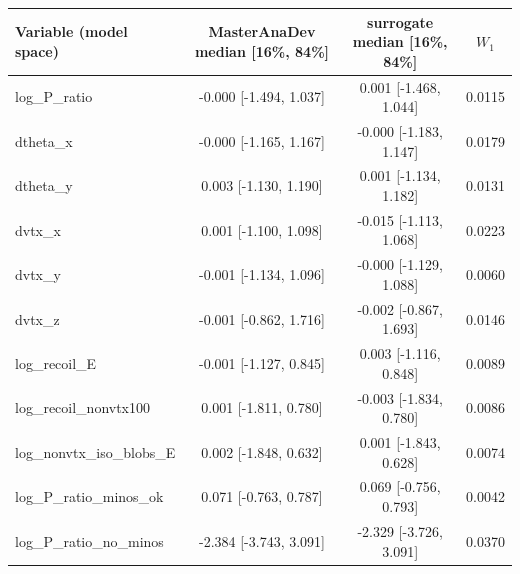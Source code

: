 \begin{tabular}{lccc}
\toprule
Variable (model space) & MasterAnaDev median [16\%, 84\%] & surrogate median [16\%, 84\%] & $W_1$ \\
\midrule
log\_P\_ratio & -0.000 [-1.494, 1.037] & 0.001 [-1.468, 1.044] & 0.0115 \\
dtheta\_x & -0.000 [-1.165, 1.167] & -0.000 [-1.183, 1.147] & 0.0179 \\
dtheta\_y & 0.003 [-1.130, 1.190] & 0.001 [-1.134, 1.182] & 0.0131 \\
dvtx\_x & 0.001 [-1.100, 1.098] & -0.015 [-1.113, 1.068] & 0.0223 \\
dvtx\_y & -0.001 [-1.134, 1.096] & -0.000 [-1.129, 1.088] & 0.0060 \\
dvtx\_z & -0.001 [-0.862, 1.716] & -0.002 [-0.867, 1.693] & 0.0146 \\
log\_recoil\_E & -0.001 [-1.127, 0.845] & 0.003 [-1.116, 0.848] & 0.0089 \\
log\_recoil\_nonvtx100 & 0.001 [-1.811, 0.780] & -0.003 [-1.834, 0.780] & 0.0086 \\
log\_nonvtx\_iso\_blobs\_E & 0.002 [-1.848, 0.632] & 0.001 [-1.843, 0.628] & 0.0074 \\
log\_P\_ratio\_minos\_ok & 0.071 [-0.763, 0.787] & 0.069 [-0.756, 0.793] & 0.0042 \\
log\_P\_ratio\_no\_minos & -2.384 [-3.743, 3.091] & -2.329 [-3.726, 3.091] & 0.0370 \\
\bottomrule
\end{tabular}
